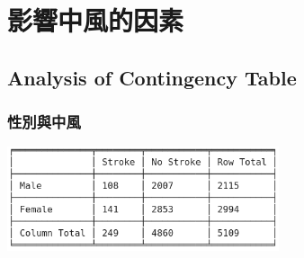 \chapter{影響中風的因素}
\section{Analysis of Contingency Table}
\subsection{性別與中風}
\begin{center}
\includegraphics[width=8cm]{./two_by_two_table/gender_stroke.png}
\end{center}




